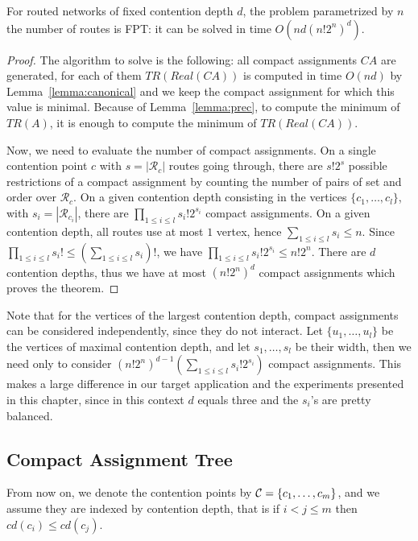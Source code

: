 \begin{theorem}\label{theorem:FPT}
For routed networks of fixed contention depth $d$, the problem \spall parametrized by $n$ the number of routes is FPT: it can be solved in time $O(nd(n!2^{n})^{d})$.
\end{theorem}
\begin{proof}
The algorithm to solve \spall is the following: all compact assignments $CA$ are generated, for each of them $TR(Real(CA))$ is computed in time $O(nd)$ by Lemma~\ref{lemma:canonical} and we keep the compact assignment for which this value is minimal.  Because of Lemma~\ref{lemma:prec}, to compute the minimum of $TR(A)$, it is enough 
to compute the minimum of $TR(Real(CA))$.

 Now, we need to evaluate the number of compact assignments. 
On a single contention point $c$ with $s = |\mathcal{R}_c|$ routes going through, there are $s!2^s$ possible restrictions of a compact assignment by counting the number of pairs of set and order over $\mathcal{R}_c$.
On a given contention depth consisting in the vertices $\{c_1,\dots,c_l\}$, with $s_i = |\mathcal{R}_{c_{i}}|$, there are 
$\prod_{1 \leq i\leq l} s_i!2^{s_i}$ compact assignments. On a given contention depth, all routes use at most $1$ vertex, hence $\sum_{1 \leq i\leq l} s_i \leq n$. Since $\prod_{1 \leq i\leq l} s_i! \leq (\sum_{1 \leq i\leq l} s_i)!$, we have $\prod_{1 \leq i\leq l} s_i!2^{s_i} \leq n!2^n$. There are $d$ contention depths, thus we have at most $ (n!2^{n})^{d}$ compact assignments which proves the theorem.
\end{proof}

Note that for the vertices of the largest contention depth, compact assignments can be considered independently, since
they do not interact. Let $\{u_1,\dots,u_l\}$ be the vertices of maximal contention depth, and let $s_1,\dots,s_l$
be their width, then we need only to consider $(n!2^{n})^{d-1}(\sum_{1 \leq i\leq l} s_{i}!2^{s_i})$ compact assignments. This makes a large difference in our target application and the experiments presented in this chapter, since in this context $d$ equals three and the $s_i$'s are pretty balanced.

\subsection{Compact Assignment Tree}

From now on, we denote the contention points by ${\cal C} = \{c_1,\dots, c_m\}$,
and we assume they are indexed by contention depth, that is  if $i < j \leq m$ then  $cd(c_i) \leq cd(c_j)$. 

